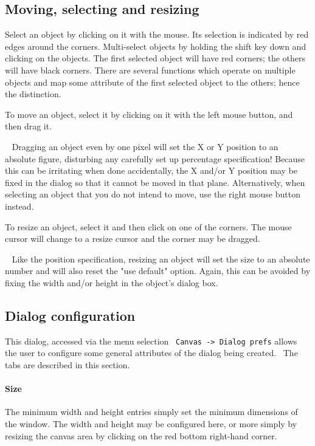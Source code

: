 \subsection*{Moving, selecting and resizing}

Select an object by clicking on it with the mouse. Its selection is
indicated by red edges around the corners. Multi-select objects by
holding the shift key down and clicking on the objects. The first
selected object will have red corners; the others will have black
corners. There are several functions which operate on multiple objects
and map some attribute of the first selected object to the others;
hence the distinction.

To move an object, select it by clicking on it with the left mouse
button, and then drag it.

\medskip{}\ {\sffamily
Dragging an object even by one
pixel will set the X or Y position to an absolute figure, disturbing
any carefully set up percentage specification! Because this can be
irritating when done accidentally, the X and/or Y position may be fixed
in the dialog so that it cannot be moved in that plane. Alternatively,
when selecting an object that you do not intend to move, use the right
mouse button instead.}\medskip

To resize an object, select it and then click on one of the corners. The
mouse cursor will change to a resize cursor and the corner may be
dragged.

\medskip{}\ {\sffamily
Like the position specification, resizing an object
will set the size to an absolute number and will also reset the
"use default" option. Again, this can be
avoided by fixing the width and/or height in the object's dialog box.}\medskip

\subsection*{Dialog configuration}

This dialog, accessed via the menu selection \ \texttt{Canvas
-{\textgreater} Dialog prefs} allows the user to configure some general
attributes of the dialog being created. \ The tabs are described in
this section.

\paragraph{Size}
The minimum width and height entries simply set the minimum dimensions
of the window. The width and height may be configured here, or more
simply by resizing the canvas area by clicking on the red bottom
right-hand corner.

